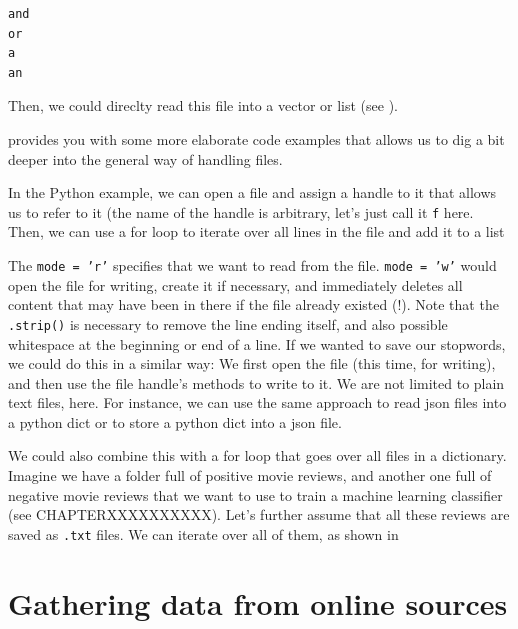 \begin{lstlisting}
and
or
a
an
\end{lstlisting}


Then, we could direclty read this file into a vector or list  (see ).




 provides you with some more elaborate code examples that allows us to dig a bit deeper into the general way of handling files.

In the Python example,  we can open a file and assign a handle to it that allows us to refer to it (the name of the handle is arbitrary, let's just call it \texttt{f} here.
Then, we can use a for loop to iterate over all lines in the file and add it to a list

The \texttt{mode = 'r'} specifies that we want to read from the file. \texttt{mode = 'w'} would open the file for writing, create it if necessary, and immediately deletes all content that may have been in there if the file already existed (!).
Note that the \texttt{.strip()} is necessary to remove the line ending itself, and also possible whitespace at the beginning or end of a line.
If we wanted to save our stopwords, we could do this in a similar way: We first open the file (this time, for writing), and then use the file handle's methods to write to it.
We are not limited to plain text files, here. For instance, we can use the same approach to read json files into a python dict or to store a python dict into a json file.

We could also combine this with a for loop that goes over all files in a dictionary.
Imagine we have a folder full of positive movie reviews, and another one full of negative movie reviews that we want to use to train a machine learning classifier (see CHAPTERXXXXXXXXXX). Let's further assume that all these reviews are saved as \texttt{.txt} files.
We can iterate over all of them, as shown in 







\section{Gathering data from online sources}
\label{sec:gathering}

